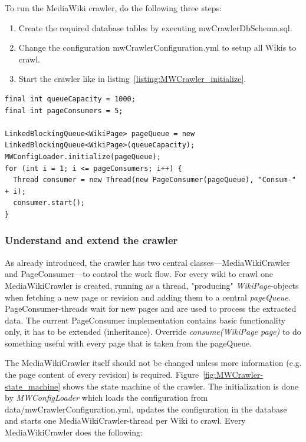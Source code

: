 To run the MediaWiki crawler, do the following three steps: 
\begin{enumerate}
	\item Create the required database tables by executing mwCrawlerDbSchema.sql.
	\item Change the configuration mwCrawlerConfiguration.yml to setup all Wikis to crawl.
	\item Start the crawler like in listing~\ref{listing:MWCrawler_initialize}.
\end{enumerate}  

\begin{codelisting}
\begin{lstlisting}[caption=MediaWiki crawler initialization.,frame=tb,breaklines=true,label=listing:MWCrawler_initialize]
final int queueCapacity = 1000;
final int pageConsumers = 5;

LinkedBlockingQueue<WikiPage> pageQueue = new LinkedBlockingQueue<WikiPage>(queueCapacity);
MWConfigLoader.initialize(pageQueue);
for (int i = 1; i <= pageConsumers; i++) {
  Thread consumer = new Thread(new PageConsumer(pageQueue), "Consum-" + i);
  consumer.start();
}
\end{lstlisting}
\end{codelisting}

\subsubsection{Understand and extend the crawler}\label{sec:mw_extend}

As already introduced, the crawler has two central classes---MediaWikiCrawler and PageConsumer---to control the work flow. For every wiki to crawl one MediaWikiCrawler is created, running as a thread, "producing" \emph{WikiPage}-objects when fetching a new page or revision and adding them to a central \emph{pageQueue}. PageConsumer-threads wait for new pages and are used to process the extracted data. The current PageConsumer implementation contains basic functionality only, it has to be extended (inheritance). Override \emph{consume(WikiPage page)} to do something useful with every page that is taken from the pageQueue. 

The MediaWikiCrawler itself should not be changed unless more information (e.g. the page content of every revision) is required. Figure~\ref{fig:MWCrawler-state_machine} shows the state machine of the crawler. The initialization is done by \emph{MWConfigLoader} which loads the configuration from data/mwCrawlerConfiguration.yml, updates the configuration in the database and starts one MediaWikiCrawler-thread per Wiki to crawl. Every MediaWikiCrawler does the following: 


